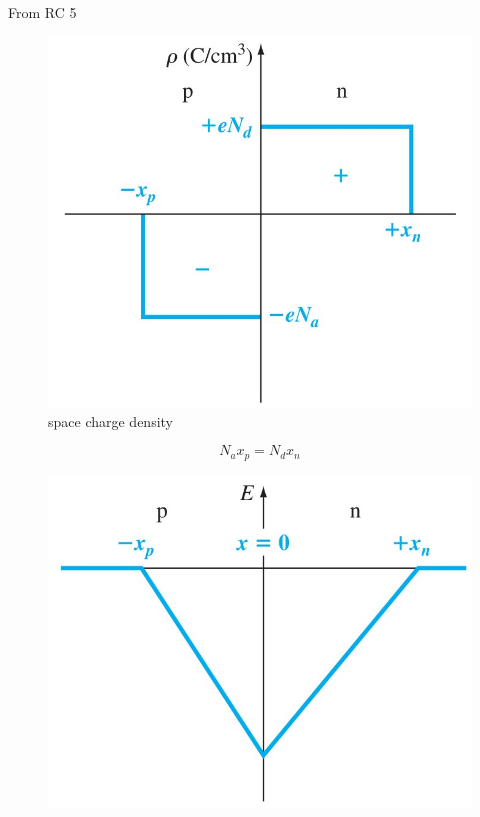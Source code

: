 \documentclass{beamer}
\begin{document}
    \begin{frame}{From RC 5}
        \begin{minipage}{\linewidth}
            \begin{minipage}[b]{0.49\linewidth}
                \begin{figure}[H]
                    \centering
                    \includegraphics[width=0.95\linewidth]{Space-charge-density.jpg}
                    \caption{space charge density}
                    \label{fig:Space-charge-density.jpg}
                \end{figure}
                \begin{equation*}
                    N_a x_p = N_d x_n
                \end{equation*}
            \end{minipage}
            \begin{minipage}[b]{0.49\linewidth}
                \begin{figure}[H]
                    \centering
                    \includegraphics[width=0.95\linewidth]{pn-junction-electric-field.jpg}

\end{figure}
\end{minipage}
\end{minipage}
\end{frame}
\end{document}
